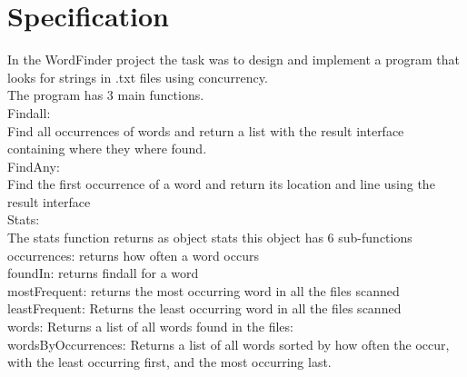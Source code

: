 \documentclass[a4paper,10pt,titlepage]{report}
\begin{document}
\section{Specification}
 In the WordFinder project the task was to design and implement a program that looks for strings in .txt files using concurrency. \\ 
  \vspace*{5mm}  
The program has 3 main functions. \\
Findall: \\
\hspace*{5mm}Find all occurrences of words and return a list with the result interface containing where they where found. \\
FindAny: \\
\hspace*{5mm}	Find the first occurrence of a word and return its location and line using the result interface \\
Stats: \\
\hspace*{5mm}	The stats function returns as object stats this object has 6 sub-functions \\
\hspace*{10mm}	occurrences:  returns how often a word occurs \\
\hspace*{10mm}	foundIn:  	returns findall for a word \\
\hspace*{10mm}	mostFrequent:  	returns the most occurring word in all the files scanned  \\
\hspace*{10mm}	leastFrequent: 	Returns the least occurring word in all the files scanned \\
\hspace*{10mm}	words: 	Returns a list of all words found in the files: \\
\hspace*{10mm}	wordsByOccurrences: Returns a list of all words sorted by how often the occur, with the least occurring first, and the most occurring last. \\
	
\end{document}
